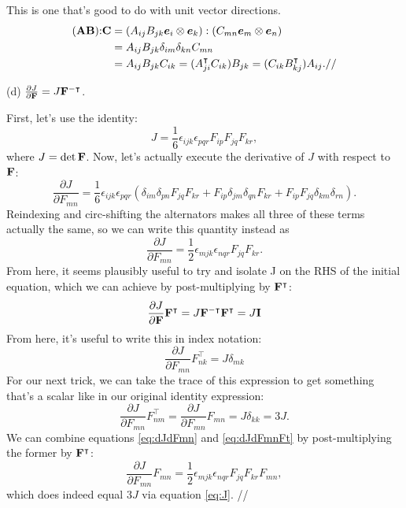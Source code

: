 This is one that's good to do with unit vector directions. 
\begin{align*}
     (\mathbf{A} \mathbf{B}) \mathbf{:} \mathbf{C} &= (A_{ij} B_{jk} \bm{e}_i \otimes \bm{e}_k) : (C_{mn} \bm{e}_m \otimes \bm{e}_n)\\
     &= A_{ij} B_{jk} \delta_{im} \delta_{kn} C_{mn}\\
     &= A_{ij} B_{jk} C_{ik} = (A^\intercal_{ji} C_{ik})B_{jk} = (C_{ik} B^\intercal_{kj}) A_{ij}.//
\end{align*}

(d) $\frac{\partial J}{\partial \mathbf{F}} = J \mathbf{F}^{-\intercal}$.

First, let's use the identity:
\begin{equation}
\label{eq:J}
    J = \frac{1}{6} \epsilon_{ijk} \epsilon_{pqr} F_{ip} F_{jq} F_{kr},
\end{equation}
where $J = \det \mathbf{F}$. 
Now, let's actually execute the derivative of $J$ with respect to $\mathbf{F}$:
\begin{equation*}
    \frac{\partial J}{\partial F_{mn}} = \frac{1}{6} \epsilon_{ijk} \epsilon_{pqr} (\delta_{im} \delta_{pn} F_{jq} F_{kr} + F_{ip} \delta_{jm} \delta_{qn} F_{kr} + F_{ip} F_{jq} \delta_{km} \delta_{rn}). 
\end{equation*}
Reindexing and circ-shifting the alternators makes all three of these terms actually the same, so we can write this quantity instead as
\begin{equation}
\label{eq:dJdFmn}
    \frac{\partial J}{\partial F_{mn}} = \frac{1}{2} \epsilon_{mjk} \epsilon_{nqr} F_{jq} F_{kr}.
\end{equation}
From here, it seems plausibly useful to try and isolate J on the RHS of the initial equation, which we can achieve by post-multiplying by $\mathbf{F}^\intercal$:
\begin{equation*}
    \frac{\partial J}{\partial \mathbf{F}} \mathbf{F}^\intercal = J \mathbf{F}^{-\intercal} \mathbf{F}^\intercal = J\mathbf{I}
\end{equation*}
From here, it's useful to write this in index notation:
\begin{equation*}
\frac{\partial J}{\partial F_{mn}} F^\intercal_{nk} = J \delta_{mk}
\end{equation*}
For our next trick, we can take the trace of this expression to get something that's a scalar like in our original identity expression:
\begin{equation}
\label{eq:dJdFmnFt}
    \frac{\partial J}{\partial F_{mn}} F^\intercal_{nm} = \frac{\partial J}{\partial F_{mn}} F_{mn} = J \delta_{kk} = 3J.
\end{equation}
We can combine equations \ref{eq:dJdFmn} and \ref{eq:dJdFmnFt} by post-multiplying the former by $\mathbf{F}^\intercal$:
\begin{equation*}
    \frac{\partial J}{\partial F_{mn}} F_{mn} = \frac{1}{2} \epsilon_{mjk} \epsilon_{nqr} F_{jq} F_{kr} F_{mn},
\end{equation*}
which does indeed equal $3J$ via equation \ref{eq:J}. //

